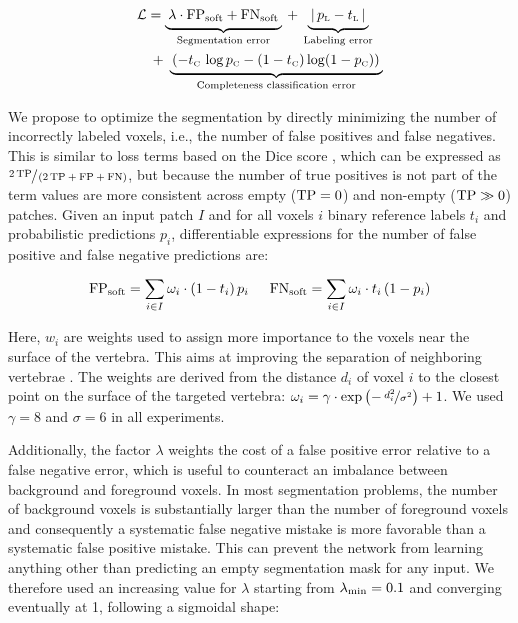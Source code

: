 \documentclass[authoryear,5p,final,times]{elsarticle}
\begin{document}
    \begin{equation*}
        \begin{aligned}
            \mathcal{L} & =
            \underbrace{\strut \:\lambda \cdot \textnormal{FP}_{\textnormal{soft}} + \textnormal{FN}_{\textnormal{soft}}\:}_\text{Segmentation error}
            \:+\:
            \underbrace{\strut \:|\, p_\textnormal{\tiny L} - t_\textnormal{\tiny L}\, |\:}_\text{Labeling error}
            \\ &
            \:+\:
            \underbrace{\strut \left(-t_\textnormal{\tiny C} \, \log p_\textnormal{\tiny C} - (1 - t_\textnormal{\tiny C}) \log (1 - p_\textnormal{\tiny C})\right)\:}_\text{Completeness classification error}
        \end{aligned}
    \end{equation*}

    We propose to optimize the segmentation by directly minimizing the number of incorrectly labeled voxels, i.e., the number of false positives and false negatives. This is similar to loss terms based on the Dice score \citep{Milletari2016}, which can be expressed as $\sfrac{2\,\textnormal{TP}}{\left(2\,\textnormal{TP} + \textnormal{FP} + \textnormal{FN}\right)}$, but because the number of true positives is not part of the term values are more consistent across empty ($\textnormal{TP} = 0$) and non-empty ($\textnormal{TP} \gg 0$) patches. Given an input patch $I$ and for all voxels $i$ binary reference labels $t_i$ and probabilistic predictions $p_i$, differentiable expressions for the number of false positive and false negative predictions are:

    \begin{equation*}
        \textnormal{FP}_{\textnormal{soft}} = \sum_{i \in I} \omega_{i} \cdot (1 - t_{i}) \, p_{i}
        \quad\enspace
        \textnormal{FN}_{\textnormal{soft}} = \sum_{i \in I} \omega_{i} \cdot t_{i} \, (1 - p_{i})
    \end{equation*}

    \noindent
    Here, $w_i$ are weights used to assign more importance to the voxels near the surface of the vertebra. This aims at improving the separation of neighboring vertebrae \citep{Ronneberger2015}. The weights are derived from the distance $d_i$ of voxel $i$ to the closest point on the surface of the targeted vertebra: $
        \omega_i = \gamma \cdot \exp \left( -\, \nicefrac{d_i^2}{\sigma^2} \right) + 1
    $. We used $\gamma = 8$ and $\sigma = 6$ in all experiments.

    Additionally, the factor $\lambda$ weights the cost of a false positive error relative to a false negative error, which is useful to counteract an imbalance between background and foreground voxels. In most segmentation problems, the number of background voxels is substantially larger than the number of foreground voxels and consequently a systematic false negative mistake is more favorable than a systematic false positive mistake. This can prevent the network from learning anything other than predicting an empty segmentation mask for any input. We therefore used an increasing value for $\lambda$ starting from $\lambda_{\textnormal{min}} = 0.1$ and converging eventually at 1, following a sigmoidal shape:
\end{document}
